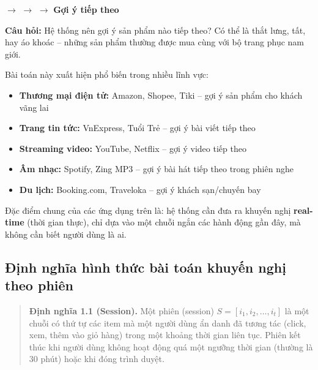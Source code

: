 \documentclass[12pt, a4paper]{article}
\begin{document}
\begin{center}
 $\longrightarrow$  $\longrightarrow$  $\longrightarrow$ \colorbox{yellow!30}{\textbf{Gợi ý tiếp theo}}
\end{center}

\textbf{Câu hỏi:} Hệ thống nên gợi ý sản phẩm nào tiếp theo? Có thể là thắt lưng, tất, hay áo khoác -- những sản phẩm thường được mua cùng với bộ trang phục nam giới.

Bài toán này xuất hiện phổ biến trong nhiều lĩnh vực:

\begin{itemize}[leftmargin=2cm]
    \item \textbf{Thương mại điện tử:} Amazon, Shopee, Tiki -- gợi ý sản phẩm cho khách vãng lai
    \item \textbf{Trang tin tức:} VnExpress, Tuổi Trẻ -- gợi ý bài viết tiếp theo
    \item \textbf{Streaming video:} YouTube, Netflix -- gợi ý video tiếp theo
    \item \textbf{Âm nhạc:} Spotify, Zing MP3 -- gợi ý bài hát tiếp theo trong phiên nghe
    \item \textbf{Du lịch:} Booking.com, Traveloka -- gợi ý khách sạn/chuyến bay
\end{itemize}

Đặc điểm chung của các ứng dụng trên là: hệ thống cần đưa ra khuyến nghị \textbf{real-time} (thời gian thực), chỉ dựa vào một chuỗi ngắn các hành động gần đây, mà không cần biết người dùng là ai.

\subsection{Định nghĩa hình thức bài toán khuyến nghị theo phiên}

\begin{quote}
\textbf{Định nghĩa 1.1 (Session).} Một phiên (session) $S = [i_1, i_2, \ldots, i_t]$ là một chuỗi có thứ tự các item mà một người dùng ẩn danh đã tương tác (click, xem, thêm vào giỏ hàng) trong một khoảng thời gian liên tục. Phiên kết thúc khi người dùng không hoạt động quá một ngưỡng thời gian (thường là 30 phút) hoặc khi đóng trình duyệt.
\end{quote}
\end{document}
